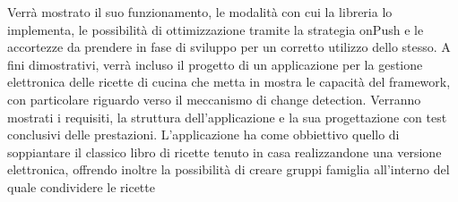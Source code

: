Verrà mostrato il suo funzionamento, le modalità con cui la libreria lo implementa, le possibilità di ottimizzazione tramite la strategia onPush e le accortezze da prendere in fase di sviluppo per un corretto utilizzo dello stesso.
\newline
A fini dimostrativi, verrà incluso il progetto di un applicazione per la gestione elettronica delle ricette di cucina che metta in mostra le capacità del framework, con particolare riguardo verso il meccanismo di change detection. Verranno mostrati i requisiti, la struttura dell'applicazione e la sua progettazione con test conclusivi delle prestazioni.
L'applicazione ha come obbiettivo quello di soppiantare il classico libro di ricette tenuto in casa realizzandone una versione elettronica, offrendo inoltre la possibilità di creare gruppi famiglia all'interno del quale condividere le ricette
